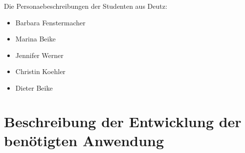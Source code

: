   Die Personaebeschreibungen der Studenten aus Deutz:
  
  \begin{itemize}

  	\item   Barbara Fenstermacher
  	\item   Marina Beike
  	\item   Jennifer Werner
  	\item   Christin Koehler
  	\item   Dieter Beike

  \end{itemize}
  



\section{Beschreibung der Entwicklung der benötigten Anwendung} %
\label{sec:beschreibung_der_entwicklung_der_benoetigten_anwendung}


